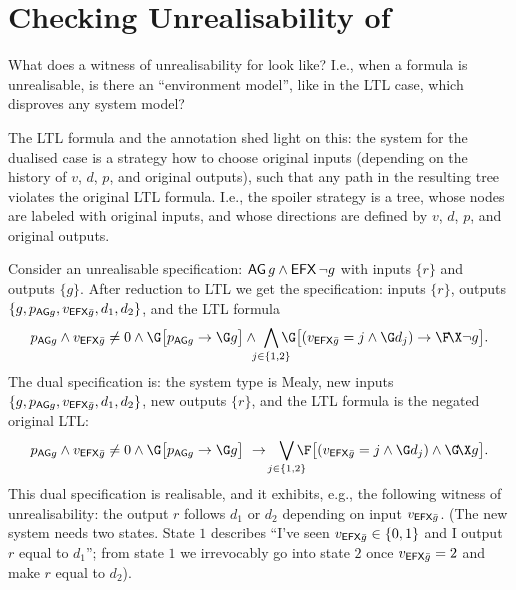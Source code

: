 %



\section{Checking Unrealisability of \CTLstar} \label{sec:ctlstar-unreal}

What does a witness of unrealisability for \CTLstar look like?
I.e., when a formula is unrealisable,
is there an ``environment model'', like in the LTL case,
which disproves any system model?

The LTL formula and the annotation shed light on this:
the system for the dualised case is a strategy how to choose original inputs
(depending on the history of $v$, $d$, $p$, and original outputs),
such that any path in the resulting tree violates the original LTL formula.
I.e., the spoiler strategy is a tree, whose nodes are labeled with original inputs,
and whose directions are defined by $v$, $d$, $p$, and original outputs.


\begin{example}
Consider an unrealisable \CTLstar specification:
$\operatorname{\mathsf{AG}} g \land \operatorname{\mathsf{EFX}}\neg g$ with inputs $\{r\}$ and outputs $\{g\}$.
After reduction to LTL we get the specification:
inputs $\{r\}$, outputs $\{g,p_{\operatorname{\mathsf{AG}}\!g},v_{\operatorname{\mathsf{EFX}}\!\bar g},d_1,d_2\}$,
and the LTL formula
$$
p_{\AG\!g} \land v_{\EFX\!\bar g} \neq 0 \land
\G\big[ p_{\AG\!g} \impl \G g \big] \land\!\!\!
\bigwedge_{j \in \{1,2\}}\!\!\!\!\!\G\big[ (v_{\EFX\!\bar g} = j \land \G d_j)  \impl  \F\!\X\neg g \big].
$$
The dual specification is:
the system type is Mealy,
new inputs $\{g,p_{\operatorname{\mathsf{AG}}\!g},v_{\operatorname{\mathsf{EFX}}\!\bar g},d_1,d_2\}$,
new outputs $\{r\}$,
and the LTL formula is the negated original LTL:
$$
p_{\AG\!g} \land v_{\EFX\!\bar g} \neq 0 \land
\G\big[ p_{\AG\!g} \impl \G g \big] ~\impl\!
\bigvee_{j \in \{1,2\}}\!\!\!\!\!\F\big[ (v_{\EFX\!\bar g} = j \land \G d_j)  \land  \G\!\X g \big].
$$
This dual specification is realisable, and it exhibits, e.g., the following witness of unrealisability:
the output $r$ follows $d_1$ or $d_2$ depending on input $v_{\operatorname{\mathsf{EFX}}\!\bar g}$.
(The new system needs two states.
 State $1$ describes ``I've seen $v_{\operatorname{\mathsf{EFX}}\!\bar g}\in\{0,1\}$ and I output $r$ equal to  $d_1$'';
 from state $1$ we irrevocably go into state $2$ once $v_{\operatorname{\mathsf{EFX}}\!\bar g}=2$ and make $r$ equal to $d_2$).
\end{example}

